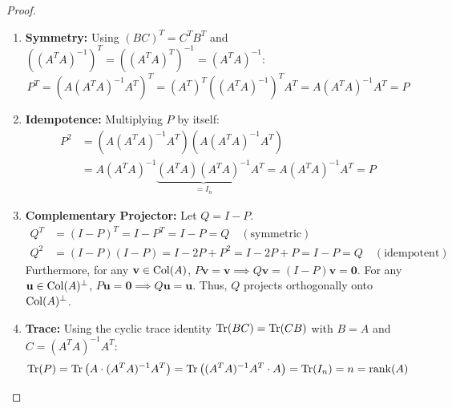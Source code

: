 \begin{proof}
\begin{enumerate}
    \item \textbf{Symmetry:} Using $(BC)^T = C^T B^T$ and $((A^T A)^{-1})^T = ((A^T A)^T)^{-1} = (A^T A)^{-1}$:
    \begin{equation}
    P^T = \left( A(A^T A)^{-1}A^T \right)^T = (A^T)^T \left( (A^T A)^{-1} \right)^T A^T = A (A^T A)^{-1} A^T = P
    \end{equation}
    \item \textbf{Idempotence:} Multiplying $P$ by itself:
    \begin{align}
    P^2 &= \left( A(A^T A)^{-1}A^T \right) \left( A(A^T A)^{-1}A^T \right) \\
    &= A (A^T A)^{-1} \underbrace{\left( A^T A \right) (A^T A)^{-1}}_{= I_n} A^T = A (A^T A)^{-1} A^T = P
    \end{align}
    \item \textbf{Complementary Projector:} Let $Q = I - P$.
    \begin{align}
    Q^T &= (I - P)^T = I - P^T = I - P = Q \quad (\text{symmetric}) \\
    Q^2 &= (I - P)(I - P) = I - 2P + P^2 = I - 2P + P = I - P = Q \quad (\text{idempotent})
    \end{align}
    Furthermore, for any $\mathbf{v} \in \operatorname{Col}(A)$, $P\mathbf{v} = \mathbf{v} \implies Q\mathbf{v} = (I - P)\mathbf{v} = \mathbf{0}$. For any $\mathbf{u} \in \operatorname{Col}(A)^\perp$, $P\mathbf{u} = \mathbf{0} \implies Q\mathbf{u} = \mathbf{u}$. Thus, $Q$ projects orthogonally onto $\operatorname{Col}(A)^\perp$.
    \item \textbf{Trace:} Using the cyclic trace identity $\operatorname{Tr}(BC) = \operatorname{Tr}(CB)$ with $B = A$ and $C = (A^T A)^{-1}A^T$:
    \begin{equation}
    \operatorname{Tr}(P) = \operatorname{Tr}\left( A \cdot (A^T A)^{-1}A^T \right) = \operatorname{Tr}\left( (A^T A)^{-1}A^T \cdot A \right) = \operatorname{Tr}(I_n) = n = \operatorname{rank}(A)
    \end{equation}
\end{enumerate}
\end{proof}

